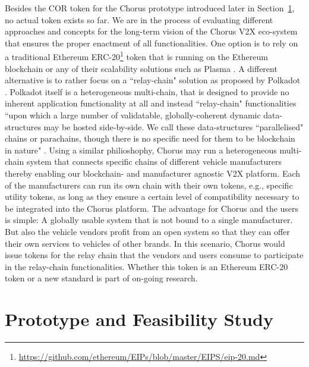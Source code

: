 \documentclass{llncs}
\begin{document}
{			Besides the COR token for the Chorus prototype introduced later in Section~\ref{s:section-6}, no actual token exists so far. We are in the process of evaluating different approaches and concepts for the long-term vision of the Chorus V2X eco-system that ensures the proper enactment of all functionalities. One option is to rely on a traditional Ethereum ERC-20\footnote{\url{https://github.com/ethereum/EIPs/blob/master/EIPS/eip-20.md}} token that is running on the Ethereum blockchain or any of their scalability solutions such as Plasma \cite{plasmaWhitepaper}. A different alternative is to rather focus on a ``relay-chain" solution as proposed by Polkadot \cite{polkadotWhitepaper}. Polkadot itself is a heterogeneous multi-chain, that is designed to provide no inherent application functionality at all and instead ``relay-chain" functionalities ``upon which a large number of validatable, globally-coherent dynamic data-structures may be hosted side-by-side. We call these data-structures ``parallelised" chains or parachains, though there is no specific need for them to be blockchain in nature" \cite{polkadotWhitepaper}. Using a similar philioshophy, Chorus may run a heterogeneous multi-chain system that connects specific chains of different vehicle manufacturers thereby enabling our blockchain- and manufacturer agnostic V2X platform. Each of the manufacturers can run its own chain with their own tokens, e.g., specific utility tokens, as long as they ensure a certain level of compatibility necessary to be integrated into the Chorus platform. The advantage for Chorus and the users is simple: A globally usable system that is not bound to a single manufacturer. But also the vehicle vendors profit from an open system so that they can offer their own services to vehicles of other brands. In this scenario, Chorus would issue tokens for the relay chain that the vendors and users consume to participate in the relay-chain functionalities. Whether this token is an Ethereum ERC-20 token or a new standard is part of on-going research.
			 
			



	\section{Prototype and Feasibility Study}
		\label{s:section-6}	
			
}
\end{document}
